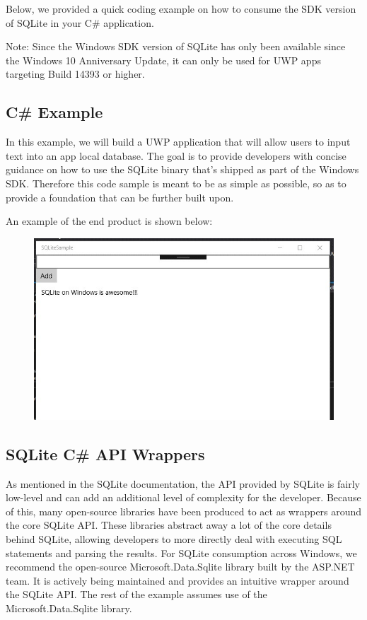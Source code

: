 Below, we provided a quick coding example on how to consume the SDK version of SQLite in your C\# application.

Note: Since the Windows SDK version of SQLite has only been available since the Windows 10 Anniversary Update, it can only be used for UWP apps targeting Build 14393 or higher.

\subsection{C\# Example}

In this example, we will build a UWP application that will allow users to input text into an app local database. The goal is to provide developers with concise guidance on how to use the SQLite binary that’s shipped as part of the Windows SDK. Therefore this code sample is meant to be as simple as possible, so as to provide a foundation that can be further built upon.

An example of the end product is shown below:

\begin{figure}
	\centering
	\includegraphics[width=\linewidth]{figures/Sqlite_sample}
	\caption{}
	\label{fig:sqlitesample}
\end{figure}

\subsection{SQLite C\# API Wrappers}

As mentioned in the SQLite documentation, the API provided by SQLite is fairly low-level and can add an additional level of complexity for the developer. Because of this, many open-source libraries have been produced to act as wrappers around the core SQLite API. These libraries abstract away a lot of the core details behind SQLite, allowing developers to more directly deal with executing SQL statements and parsing the results.
For SQLite consumption across Windows, we recommend the open-source Microsoft.Data.Sqlite library built by the ASP.NET team. It is actively being maintained and provides an intuitive wrapper around the SQLite API. The rest of the example assumes use of the Microsoft.Data.Sqlite library.

